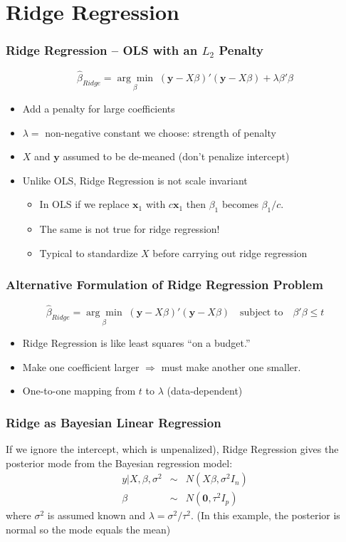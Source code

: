 \section{Ridge Regression}
\begin{frame}
  \frametitle{Ridge Regression -- OLS with an $L_2$ Penalty}


	$$\widehat{\beta}_{Ridge} =\underset{\beta}{\arg \min}\;(\mathbf{y} - X\beta)' (\mathbf{y} - X\beta) + \lambda \beta'\beta$$
  \begin{itemize}
    \item Add a penalty for large coefficients
    \item $\lambda = $ non-negative constant we choose: strength of penalty
    \item $X$ and $\mathbf{y}$ assumed to be \alert{de-meaned} (don't penalize intercept)
    \item Unlike OLS, Ridge Regression is \alert{not scale invariant}
      \begin{itemize}
        \item In OLS if we replace $\mathbf{x}_1$ with $c\mathbf{x}_1$ then $\beta_1$ becomes $\beta_1/c$.
        \item The same is not true for ridge regression!
        \item Typical to \alert{standardize} $X$ before carrying out ridge regression 
      \end{itemize}
  \end{itemize}
\end{frame}
\begin{frame}
  \frametitle{Alternative Formulation of Ridge Regression Problem}
$$\widehat{\beta}_{Ridge} = \underset{\beta}{\arg \min}\;(\mathbf{y} - X\beta)' (\mathbf{y} - X\beta) \quad \mbox{subject to} \quad \beta'\beta \leq t$$


\begin{itemize}
  \item Ridge Regression is like least squares ``on a budget.'' 
  \item Make one coefficient larger $\Rightarrow$ must make another one smaller.
  \item One-to-one mapping from $t$ to $\lambda$ (data-dependent)
\end{itemize}

\end{frame}
\begin{frame}
  \frametitle{Ridge as Bayesian Linear Regression}

If we ignore the intercept, which is unpenalized), Ridge Regression gives the \alert{posterior mode} from the Bayesian regression model:
	\begin{eqnarray*}
		y|X, \beta, \sigma^2 &\sim& N(X\beta,\sigma^2 I_n) \\
		\beta &\sim& N(\mathbf{0}, \tau^2 I_p)
	\end{eqnarray*}
where $\sigma^2$ is assumed known and $\lambda = \sigma^2/\tau^2$. 
(In this example, the posterior is normal so the mode equals the mean)


\end{frame}
